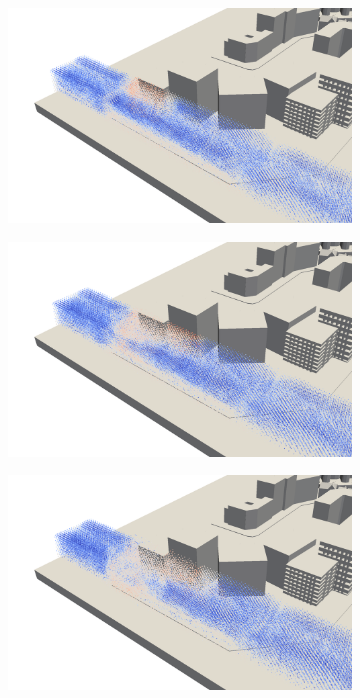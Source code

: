 \begin{figure}
  \begin{subfigure}{.5\textwidth}
    \centering
    \includegraphics[width=\textwidth]{figures/visc-0.png}
  \end{subfigure}
  \begin{subfigure}{.5\textwidth}
    \centering
    \includegraphics[width=\textwidth]{figures/visc-1.png}
  \end{subfigure}
  \begin{subfigure}{.5\textwidth}
    \centering
    \includegraphics[width=\textwidth]{figures/visc-2.png}

\end{subfigure}
\end{figure}
